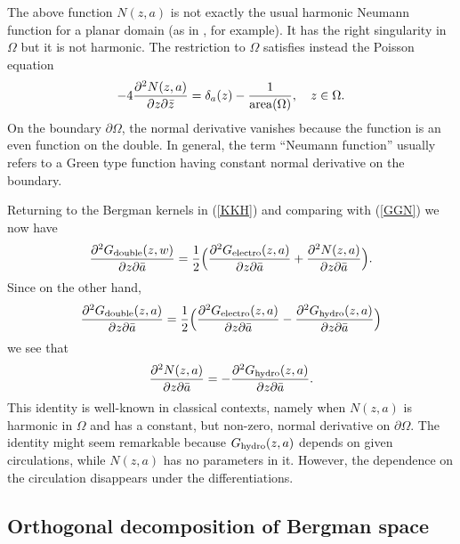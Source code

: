 \documentclass[reqno,12pt]{article}
\theoremstyle{plain}
\theoremstyle{definition}
\numberwithin{equation}{section}
\numberwithin{figure}{section}
\begin{document}
The above function $N(z,a)$ is not exactly the usual harmonic Neumann function for a planar domain (as in \cite{Nehari-1952},
for example).  It has the right singularity in $\Omega$ but it is not harmonic. 
The restriction to $\Omega$ satisfies instead the Poisson equation
$$
-4\frac{\partial^2 N(z,a)}{\partial z\partial\bar{z}} =\delta_a(z)-\frac{1}{{\rm area}(\Omega)}, \quad z\in\Omega.
$$
On the boundary $\partial\Omega$, the normal derivative vanishes because the function is an even function on the double.
In general, the term ``Neumann function'' usually refers to a Green type function having  constant normal derivative on the
boundary. 

Returning to the Bergman kernels in (\ref{KKH}) and comparing with (\ref{GGN}) we now have
$$
\frac{\partial^2 G_{\rm double}(z,w)}{\partial z \partial\bar{a}}
=\frac{1}{2}\Big(\frac{\partial^2 G_{\rm electro}(z,a)}{\partial z \partial\bar{a}}
+\frac{\partial^2 N(z,a)}{\partial z \partial\bar{a}}\Big).
$$
Since on the other hand,
$$
\frac{\partial^2 G_{\rm double}(z,a)}{\partial z \partial\bar{a}}
=\frac{1}{2}\Big(\frac{\partial^2 G_{\rm electro}(z,a)}{\partial z \partial\bar{a}}
-\frac{\partial^2 G_{\rm hydro}(z,a)}{\partial z \partial\bar{a}}\Big)
$$
we see that
\begin{equation}\label{NG}
\frac{\partial^2 N(z,a)}{\partial z \partial\bar{a}}=-\frac{\partial^2 G_{\rm hydro}(z,a)}{\partial z \partial\bar{a}}.
\end{equation}
This identity is well-known in classical contexts, namely when $N(z,a)$ is harmonic in $\Omega$ and has a constant,
but non-zero, normal derivative on $\partial\Omega$.
The identity might seem remarkable because $G_{\rm hydro}(z,a)$
depends on given circulations, while $N(z,a)$ has no parameters in it. However, the dependence 
on the circulation disappears under the differentiations. 


\subsection{Orthogonal decomposition of Bergman space}\label{sec:orthogonal}
\end{document}
